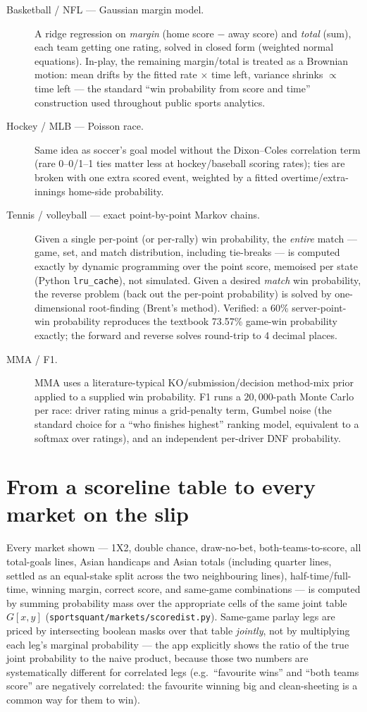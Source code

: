 \documentclass[11pt]{article}
\begin{document}
\begin{description}
\item[Basketball / NFL --- Gaussian margin model.] A ridge regression on
\emph{margin} (home score $-$ away score) and \emph{total} (sum), each team getting one rating,
solved in closed form (weighted normal equations). In-play, the remaining margin/total is treated
as a Brownian motion: mean drifts by the fitted rate $\times$ time left, variance shrinks $\propto$
time left --- the standard ``win probability from score and time'' construction used throughout
public sports analytics.
\item[Hockey / MLB --- Poisson race.] Same idea as soccer's goal model without the Dixon--Coles
correlation term (rare 0--0/1--1 ties matter less at hockey/baseball scoring rates); ties are
broken with one extra scored event, weighted by a fitted overtime/extra-innings home-side
probability.
\item[Tennis / volleyball --- exact point-by-point Markov chains.] Given a single per-point (or
per-rally) win probability, the \emph{entire} match --- game, set, and match distribution,
including tie-breaks --- is computed exactly by dynamic programming over the point score, memoised
per state (Python \texttt{lru\_cache}), not simulated. Given a desired \emph{match} win
probability, the reverse problem (back out the per-point probability) is solved by one-dimensional
root-finding (Brent's method). Verified: a 60\% server-point-win probability reproduces the
textbook 73.57\% game-win probability exactly; the forward and reverse solves round-trip to 4
decimal places.
\item[MMA / F1.] MMA uses a literature-typical KO/submission/decision method-mix prior applied to
a supplied win probability. F1 runs a $20{,}000$-path Monte Carlo per race: driver rating minus a
grid-penalty term, Gumbel noise (the standard choice for a ``who finishes highest'' ranking model,
equivalent to a softmax over ratings), and an independent per-driver DNF probability.
\end{description}

\section{From a scoreline table to every market on the slip}
\label{sec:markets}
Every market shown --- 1X2, double chance, draw-no-bet, both-teams-to-score, all total-goals
lines, Asian handicaps and Asian totals (including quarter lines, settled as an equal-stake split
across the two neighbouring lines), half-time/full-time, winning margin, correct score, and same-game
combinations --- is computed by summing probability mass over the appropriate cells of the same
joint table $G[x,y]$ (\texttt{sportsquant/markets/scoredist.py}). Same-game parlay legs are priced
by intersecting boolean masks over that table \emph{jointly}, not by multiplying each leg's
marginal probability --- the app explicitly shows the ratio of the true joint probability to the
naive product, because those two numbers are systematically different for correlated legs (e.g.\
``favourite wins'' and ``both teams score'' are negatively correlated: the favourite winning big
and clean-sheeting is a common way for them to win).
\end{document}
